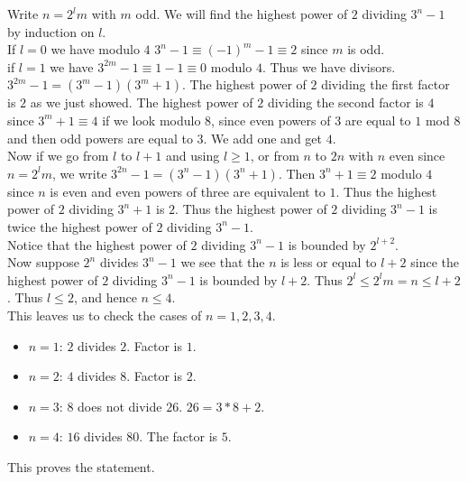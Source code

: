 \documentclass[../Thesis.tex]{subfiles}
\begin{document}
\begin{myproof}
Write $n = 2^lm$ with $m$ odd. We will find the highest power of $2$ dividing $3^n-1$ by induction on $l$.
\\If $l = 0$ we have modulo $4$ $3^n -1 \equiv (-1)^m-1 \equiv 2$ since $m$ is odd.
\\if $l = 1$ we have $3^{2m}-1 \equiv 1 -1 \equiv 0$ modulo $4$. Thus we have divisors. $3^{2m}-1 = (3^m-1)(3^m+1)$. The highest power of $2$ dividing the first factor is $2$ as we just showed. The highest power of $2$ dividing the second factor is $4$ since $3^m + 1 \equiv 4$ if we look modulo $8$, since even powers of $3$ are equal to $1$ mod $8$ and then odd powers are equal to $3$. We add one and get $4$.
\\Now if we go from $l$ to $l+1$ and using $l \geq 1$, or from $n$ to $2n$ with $n$ even since $n = 2^lm$, we write $3^{2n}-1 = (3^n-1)(3^n+1)$. Then $3^n + 1 \equiv 2$ modulo $4$ since $n$ is even and even powers of three are equivalent to $1$. Thus the highest power of $2$ dividing $3^n + 1$ is $2$. Thus the highest power of $2$ dividing $3^n - 1$ is twice the highest power of $2$ dividing $3^n - 1$. 
\\Notice that the highest power of $2$ dividing $3^n -1$ is bounded by $2^{l+2}$.
\\Now suppose $2^n$ divides $3^n -1$ we see that the $n$ is less or equal to $l + 2$ since the highest power of $2$ dividing $3^n -1$ is bounded by $l + 2$. Thus $2^l \leq 2^l m = n \leq l + 2$. Thus $l \leq 2$, and hence $n \leq 4$.
\\This leaves us to check the cases of $n = 1, 2, 3, 4$.
\begin{itemize}
\item $n = 1$: $2$ divides $2$. Factor is $1$.
\item $n = 2$: $4$ divides $8$. Factor is $2$.
\item $n = 3$: $8$ does not divide $26$. $26 = 3 * 8 + 2$.
\item $n = 4$: $16$ divides $80$. The factor is $5$.
\end{itemize}
This proves the statement.
\end{myproof}
\end{document}

